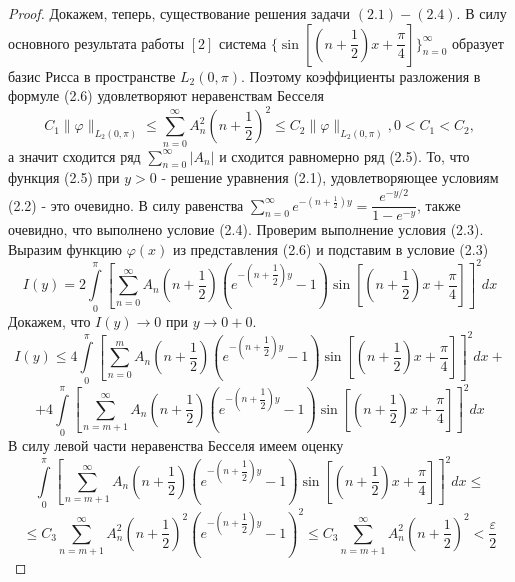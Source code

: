 \documentclass[a4paper, 12pt]{article}
\numberwithin{equation}{section}
\numberwithin{lemma}{section}
\numberwithin{definition}{section}
\numberwithin{notabene}{section}
\numberwithin{corollary}{section}
\begin{document}
\begin{proof}
	Докажем, теперь, существование решения задачи $(2.1) - (2.4)$. В силу основного результата работы $[2]$ система $\{\sin{\left[\left(n + \dfrac12\right)x + \dfrac\pi4\right]}\}_{n=0}^{\infty}$ образует базис Рисса в пространстве $L_2(0, \pi)$. Поэтому коэффициенты разложения в формуле (2.6) удовлетворяют неравенствам Бесселя
	\begin{equation*}
		C_1 \|\varphi \|_{L_2(0,\pi)} \leq \sum\limits_{n=0}^{\infty} A_n^2 \left(n + \dfrac12\right)^2 \leq C_2 \|\varphi \|_{L_2(0,\pi)} , 0 < C_1 < C_2, 
	\end{equation*}
а значит сходится ряд $\sum\limits_{n=0}^{\infty} |A_n|$ и сходится равномерно ряд (2.5). То, что функция (2.5) при $y > 0$ - решение уравнения (2.1), удовлетворяющее условиям (2.2) - это очевидно. В силу равенства $\sum\limits_{n=0}^{\infty} e^{-\left(n + \frac12\right)y} = \dfrac{e^{-y/2}}{1 - e^{-y}}$, также очевидно, что выполнено условие (2.4). Проверим выполнение условия (2.3).\newline
Выразим функцию $\varphi(x)$ из представления (2.6) и подставим в условие (2.3)
\begin{equation*}
	I(y) =  2 \int\limits_0^\pi \left[	\sum\limits_{n=0}^{\infty} A_n\left(n+\dfrac12\right) \left( e^{-\left(n+\dfrac12\right)y} - 1\right) \sin{\left[\left(n+\dfrac12\right) x  + \dfrac\pi4\right]} \right]^2 dx
\end{equation*}
Докажем, что $I(y) \to 0$ при $y \to 0+0$. 
\begin{equation*}
	I(y) \leq 4\int\limits_0^\pi \left[	\sum\limits_{n=0}^{m} A_n\left(n+\dfrac12\right) \left( e^{-\left(n+\dfrac12\right)y} - 1\right) \sin{\left[\left(n+\dfrac12\right) x  + \dfrac\pi4\right]} \right]^2 dx + 
\end{equation*}
\begin{equation*}
	+ 4\int\limits_0^\pi \left[	\sum\limits_{n=m+1}^{\infty} A_n\left(n+\dfrac12\right) \left( e^{-\left(n+\dfrac12\right)y} - 1\right) \sin{\left[\left(n+\dfrac12\right) x  + \dfrac\pi4\right]} \right]^2 dx
\end{equation*}
В силу левой части неравенства Бесселя имеем оценку
\begin{equation*}
	\int\limits_0^\pi \left[	\sum\limits_{n=m+1}^{\infty} A_n\left(n+\dfrac12\right) \left( e^{-\left(n+\dfrac12\right)y} - 1\right) \sin{\left[\left(n+\dfrac12\right) x  + \dfrac\pi4\right]} \right]^2 dx \leq 
\end{equation*}
\begin{equation*}
	\leq  C_3 \sum\limits_{n=m+1}^{\infty} A_n^2 \left(n+\dfrac12\right)^2 \left(e^{-\left(n+\dfrac12\right)y} - 1\right)^2 \leq C_3 \sum\limits_{n=m+1}^{\infty} A_n^2 \left(n+\dfrac12\right)^2 < \dfrac{\varepsilon}{2}

\end{equation*}
\end{proof}
\end{document}
